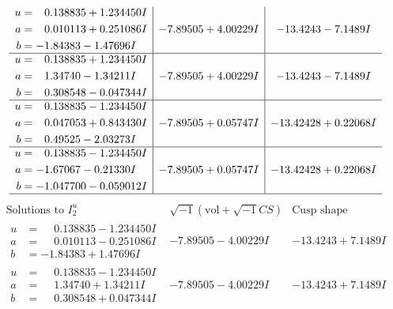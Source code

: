 \documentclass[1p]{elsarticle_modified}
\theoremstyle{definition}
\newcommand{\I}{\sqrt{-1}}
\begin{document}
$$\begin{array}{c|c|c}
\begin{aligned}
u &= \phantom{-}0.138835 + 1.234450 I \\
a &= \phantom{-}0.010113 + 0.251086 I \\
b &= -1.84383 - 1.47696 I\end{aligned}
 & -7.89505 + 4.00229 I & -13.4243 - 7.1489 I \\ \hline\begin{aligned}
u &= \phantom{-}0.138835 + 1.234450 I \\
a &= \phantom{-}1.34740 - 1.34211 I \\
b &= \phantom{-}0.308548 - 0.047344 I\end{aligned}
 & -7.89505 + 4.00229 I & -13.4243 - 7.1489 I \\ \hline\begin{aligned}
u &= \phantom{-}0.138835 - 1.234450 I \\
a &= \phantom{-}0.047053 + 0.843430 I \\
b &= \phantom{-}0.49525 - 2.03273 I\end{aligned}
 & -7.89505 + 0.05747 I & -13.42428 + 0.22068 I \\ \hline\begin{aligned}
u &= \phantom{-}0.138835 - 1.234450 I \\
a &= -1.67067 - 0.21330 I \\
b &= -1.047700 - 0.059012 I\end{aligned}
 & -7.89505 + 0.05747 I & -13.42428 + 0.22068 I\\
 \hline 
 \end{array}$$\newpage$$\begin{array}{c|c|c}  
\text{Solutions to }I^u_{2}& \I (\text{vol} + \sqrt{-1}CS) & \text{Cusp shape}\\
 \hline 
\begin{aligned}
u &= \phantom{-}0.138835 - 1.234450 I \\
a &= \phantom{-}0.010113 - 0.251086 I \\
b &= -1.84383 + 1.47696 I\end{aligned}
 & -7.89505 - 4.00229 I & -13.4243 + 7.1489 I \\ \hline\begin{aligned}
u &= \phantom{-}0.138835 - 1.234450 I \\
a &= \phantom{-}1.34740 + 1.34211 I \\
b &= \phantom{-}0.308548 + 0.047344 I\end{aligned}
 & -7.89505 - 4.00229 I & -13.4243 + 7.1489 I \\ \hline\begin{aligned}

\end{aligned}
\end{array}$$
\end{document}
